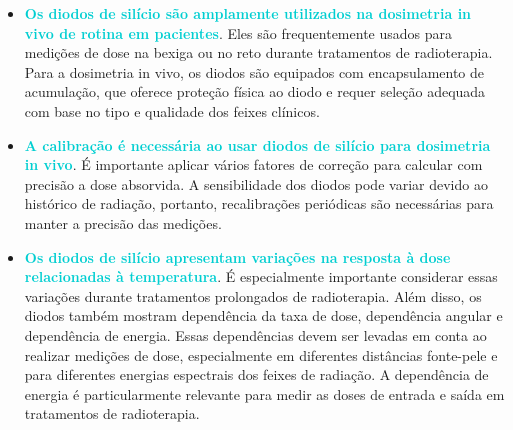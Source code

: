 \documentclass[11pt,a4paper]{article}
\newcounter{exemplo}
\begin{document}
\begin{exemplo}
\begin{itemize}
			\item \textcolor{DarkTurquoise}{\textbf{Os diodos de silício são amplamente utilizados na dosimetria in vivo de rotina em pacientes}}. Eles são frequentemente usados para medições de dose na bexiga ou no reto durante tratamentos de radioterapia. Para a dosimetria in vivo, os diodos são equipados com encapsulamento de acumulação, que oferece proteção física ao diodo e requer seleção adequada com base no tipo e qualidade dos feixes clínicos.
			\item \textcolor{DarkTurquoise}{\textbf{A calibração é necessária ao usar diodos de silício para dosimetria in vivo}}. É importante aplicar vários fatores de correção para calcular com precisão a dose absorvida. A sensibilidade dos diodos pode variar devido ao histórico de radiação, portanto, recalibrações periódicas são necessárias para manter a precisão das medições.
			\item \textcolor{DarkTurquoise}{\textbf{Os diodos de silício apresentam variações na resposta à dose relacionadas à temperatura}}. É especialmente importante considerar essas variações durante tratamentos prolongados de radioterapia. Além disso, os diodos também mostram dependência da taxa de dose, dependência angular e dependência de energia. Essas dependências devem ser levadas em conta ao realizar medições de dose, especialmente em diferentes distâncias fonte-pele e para diferentes energias espectrais dos feixes de radiação. A dependência de energia é particularmente relevante para medir as doses de entrada e saída em tratamentos de radioterapia.
		\end{itemize}
	\end{exemplo}

	\
\end{document}
